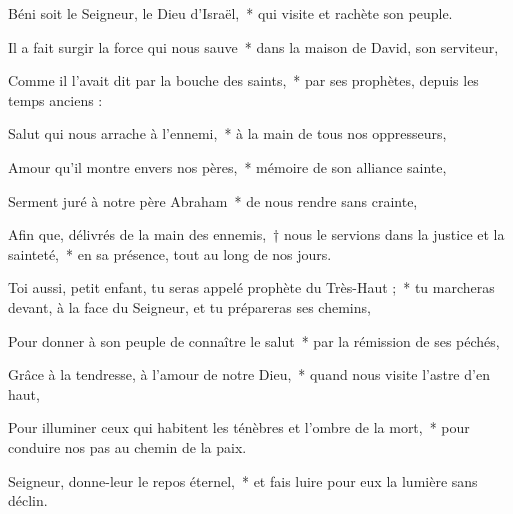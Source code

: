 \item Béni soit le Seigneur, le Dieu d’Israël,~* qui visite et rachète son peuple.

\item Il a fait surgir la force qui nous sauve~* dans la maison de David, son serviteur,

\item Comme il l’avait dit par la bouche des saints,~* par ses prophètes, depuis les temps anciens :

\item Salut qui nous arrache à l’ennemi,~* à la main de tous nos oppresseurs,

\item Amour qu’il montre envers nos pères,~* mémoire de son alliance sainte,

\item Serment juré à notre père Abraham~* de nous rendre sans crainte,

\item Afin que, délivrés de la main des ennemis,~† nous le servions dans la justice et la sainteté,~* en sa présence, tout au long de nos jours.

\item Toi aussi, petit enfant, tu seras appelé prophète du Très-Haut ;~* tu marcheras devant, à la face du Seigneur, et tu prépareras ses chemins,

\item Pour donner à son peuple de connaître le salut~* par la rémission de ses péchés,

\item Grâce à la tendresse, à l’amour de notre Dieu,~* quand nous visite l’astre d’en haut,

\item Pour illuminer ceux qui habitent les ténèbres et l’ombre de la mort,~* pour conduire nos pas au chemin de la paix.

\item Seigneur, donne-leur le repos éternel,~* et fais luire pour eux la lumière sans déclin.